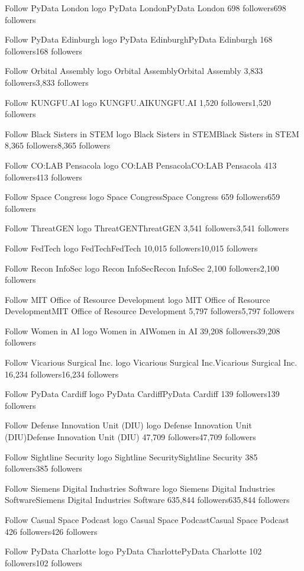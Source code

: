 Follow
PyData London logo
PyData LondonPyData London
698 followers698 followers

Follow
PyData Edinburgh logo
PyData EdinburghPyData Edinburgh
168 followers168 followers

Follow
Orbital Assembly logo
Orbital AssemblyOrbital Assembly
3,833 followers3,833 followers

Follow
KUNGFU.AI logo
KUNGFU.AIKUNGFU.AI
1,520 followers1,520 followers

Follow
Black Sisters in STEM logo
Black Sisters in STEMBlack Sisters in STEM
8,365 followers8,365 followers

Follow
CO:LAB Pensacola logo
CO:LAB PensacolaCO:LAB Pensacola
413 followers413 followers

Follow
Space Congress logo
Space CongressSpace Congress
659 followers659 followers

Follow
ThreatGEN logo
ThreatGENThreatGEN
3,541 followers3,541 followers

Follow
FedTech logo
FedTechFedTech
10,015 followers10,015 followers

Follow
Recon InfoSec logo
Recon InfoSecRecon InfoSec
2,100 followers2,100 followers

Follow
MIT Office of Resource Development logo
MIT Office of Resource DevelopmentMIT Office of Resource Development
5,797 followers5,797 followers

Follow
Women in AI logo
Women in AIWomen in AI
39,208 followers39,208 followers

Follow
Vicarious Surgical Inc. logo
Vicarious Surgical Inc.Vicarious Surgical Inc.
16,234 followers16,234 followers

Follow
PyData Cardiff logo
PyData CardiffPyData Cardiff
139 followers139 followers

Follow
Defense Innovation Unit (DIU) logo
Defense Innovation Unit (DIU)Defense Innovation Unit (DIU)
47,709 followers47,709 followers

Follow
Sightline Security logo
Sightline SecuritySightline Security
385 followers385 followers

Follow
Siemens Digital Industries Software logo
Siemens Digital Industries SoftwareSiemens Digital Industries Software
635,844 followers635,844 followers

Follow
Casual Space Podcast logo
Casual Space PodcastCasual Space Podcast
426 followers426 followers

Follow
PyData Charlotte logo
PyData CharlottePyData Charlotte
102 followers102 followers

